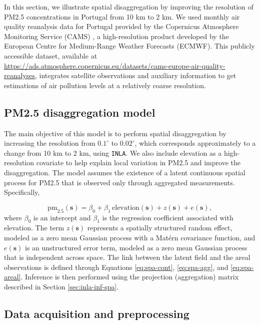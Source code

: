 In this section, we illustrate spatial disaggregation by improving the resolution of PM2.5 concentrations in Portugal from 10 km to 2 km. We used monthly air quality reanalysis data for Portugal provided by the Copernicus Atmosphere Monitoring Service (CAMS) \citep{inness2019cams}, a high-resolution product developed by the European Centre for Medium-Range Weather Forecasts (ECMWF). This publicly accessible dataset, available at \url{https://ads.atmosphere.copernicus.eu/datasets/cams-europe-air-quality-reanalyses}, integrates satellite observations and auxiliary information to get estimations of air pollution levels at a relatively coarse resolution.

\subsection{PM2.5 disaggregation model}\label{pm2.5-disaggregation-model}

The main objective of this model is to perform spatial disaggregation by increasing the resolution from \(0.1^\circ\) to \(0.02^\circ\), which corresponds approximately to a change from 10 km to 2 km, using \texttt{INLA}. We also include elevation as a high-resolution covariate to help explain local variation in PM2.5 and improve the disaggregation. The model assumes the existence of a latent continuous spatial process for PM2.5 that is observed only through aggregated measurements. Specifically,

\begin{equation}
\text{pm}_{2.5}(\mathbf{s}) = \beta_0 + \beta_1\,\text{elevation}(\mathbf{s}) + z(\mathbf{s}) + e(\mathbf{s}), \label{eq:app-pm25}
\end{equation}
where \(\beta_0\) is an intercept and \(\beta_1\) is the regression coefficient associated with elevation. The term \(z(\mathbf{s})\) represents a spatially structured random effect, modeled as a zero mean Gaussian process with a Matérn covariance function, and \(e(\mathbf{s})\) is an unstructured error term, modeled as a zero mean Gaussian process that is independent across space.
The link between the latent field and the areal observations is defined through Equations \eqref{eq:spa-cont}, \eqref{eq:spa-agg}, and \eqref{eq:spa-areal}. Inference is then performed using the projection (aggregation) matrix described in Section \ref{sec:inla-inf-spa}.

\subsection{Data acquisition and preprocessing}\label{sec:spatial-data-pre}

